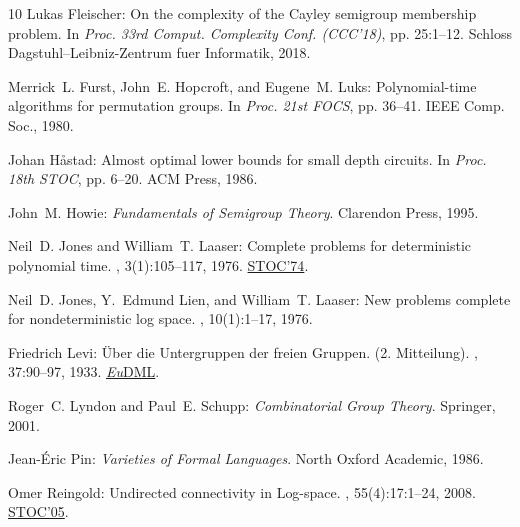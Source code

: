 \documentclass[11pt]{article}
\numberwithin{equation}{section}
\theoremstyle{definition}
\theoremstyle{plain}
\begin{document}
\begin{thebibliography}{10}
{\sc Lukas Fleischer}: On the complexity of the {C}ayley semigroup membership
  problem.
\newblock In {\em Proc. 33rd Comput. Complexity Conf. (CCC'18)}, pp. 25:1--12.
  Schloss Dagstuhl--Leibniz-Zentrum fuer Informatik, 2018.

{\sc Merrick~L. Furst, John~E. Hopcroft, and Eugene~M. Luks}: Polynomial-time
  algorithms for permutation groups.
\newblock In {\em Proc. 21st FOCS}, pp. 36--41. IEEE Comp. Soc., 1980.

{\sc Johan H{\aa}stad}: Almost optimal lower bounds for small depth circuits.
\newblock In {\em Proc. 18th STOC}, pp. 6--20. ACM Press, 1986.
\newblock [\epfmtdoi{10.1145/12130.12132}]

{\sc John~M. Howie}: {\em Fundamentals of Semigroup Theory}.
\newblock Clarendon Press, 1995.

{\sc Neil~D. Jones and William~T. Laaser}: Complete problems for deterministic
  polynomial time.
, 3(1):105--117, 1976.
\newblock \prelim \href{https://doi.org/10.1145/800119.803883}{STOC'74}.
\newblock [\epfmtdoi{10.1016/0304-3975(76)90068-2}]

{\sc Neil~D. Jones, Y.~Edmund Lien, and William~T. Laaser}: New problems
  complete for nondeterministic log space.
, 10(1):1--17, 1976.
\newblock [\epfmtdoi{10.1007/BF01683259}]

{\sc Friedrich Levi}: {\"U}ber die {U}ntergruppen der freien {G}ruppen. (2.
  {M}itteilung).
, 37:90--97, 1933.
\newblock \href{https://eudml.org/doc/168437}{\emph{Eu}DML}.

{\sc Roger~C. Lyndon and Paul~E. Schupp}: {\em Combinatorial Group Theory}.
\newblock Springer, 2001.
\newblock [\epfmtdoi{10.1007/978-3-642-61896-3}]

{\sc Jean-{\'E}ric Pin}: {\em {Varieties of Formal Languages}}.
\newblock North Oxford Academic, 1986.

{\sc Omer Reingold}: Undirected connectivity in {L}og-space.
, 55(4):17:1--24, 2008.
\newblock \prelim \href{https://doi.org/10.1145/1060590.1060647}{STOC'05}.
\newblock [\epfmtdoi{10.1145/1391289.1391291}]


\end{thebibliography}
\end{document}
